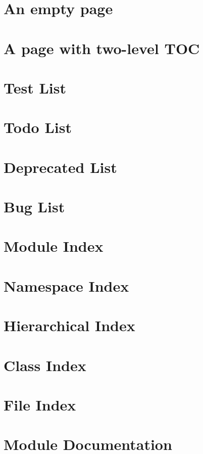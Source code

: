 \let\mypdfximage\pdfximage\def\pdfximage{\immediate\mypdfximage}\documentclass[twoside]{book}
\newcommand{\+}{\discretionary{\mbox{\scriptsize$\hookleftarrow$}}{}{}}
\begin{document}
\chapter{An empty page}
\label{empty}

\chapter{A page with two-\/level T\+OC}
\label{levels}

\chapter{Test List}
\label{test}

\chapter{Todo List}
\label{todo}

\chapter{Deprecated List}
\label{deprecated}

\chapter{Bug List}
\label{bug}

\chapter{Module Index}

\chapter{Namespace Index}

\chapter{Hierarchical Index}

\chapter{Class Index}

\chapter{File Index}

\chapter{Module Documentation}









\end{document}
